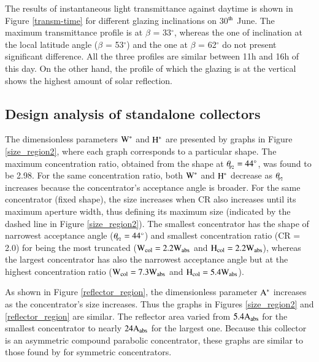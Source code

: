 
The results of instantaneous light transmittance against daytime is shown in Figure \ref{transm-time} for different glazing inclinations on 30$^{\rm th}$ June. The maximum transmittance profile is at $\beta$ = 33$^{\circ}$, whereas the one of inclination at the local latitude angle ($\beta$ = 53$^{\circ}$) and the one at $\beta$ = 62$^{\circ}$ do not present significant difference. All the three profiles are similar between 11h and 16h of this day. On the other hand, the profile of which the glazing is at the vertical shows the highest amount of solar reflection.


\subsection{Design analysis of standalone collectors}

The dimensionless parameters $\rm{W^{*}}$ and $\rm{H^{*}}$ are presented by graphs in Figure \ref{size_region2}, where each graph corresponds to a particular shape. The maximum concentration ratio, obtained from the shape at $\theta_{\!_{\rm{P2}}} = 44^{\circ}$, was found to be 2.98. For the same concentration ratio, both $\rm{W^{*}}$ and $\rm{H^{*}}$ decrease as $\theta_{\!_{\rm{P2}}}$ increases because the concentrator's acceptance angle is broader. For the same concentrator (fixed shape), the size increases when CR also increases until its maximum aperture width, thus defining its maximum size (indicated by the dashed line in Figure \ref{size_region2}). The smallest concentrator has the shape of narrowest acceptance angle ($\theta_{\!_{\rm{P2}}} = 44^{\circ}$) and smallest concentration ratio (CR = 2.0) for being the most truncated ($\rm{W_{col} = 2.2W_{abs}}$ and $\rm{H_{col} = 2.2W_{abs}}$), whereas the largest concentrator has also the narrowest acceptance angle but at the highest concentration ratio ($\rm{W_{col} = 7.3W_{abs}}$ and $\rm{H_{col} = 5.4W_{abs}}$). 

As shown in Figure \ref{reflector_region}, the dimensionless parameter $\rm{A^{*}}$ increases as the concentrator's size increases. Thus the graphs in Figures \ref{size_region2} and \ref{reflector_region} are similar. The reflector area varied from $\rm{5.4A_{abs}}$ for the smallest concentrator to nearly $\rm{24A_{abs}}$ for the largest one. Because this collector is an asymmetric compound parabolic concentrator, these graphs are similar to those found by \citet{Rabl1976} for symmetric concentrators.

